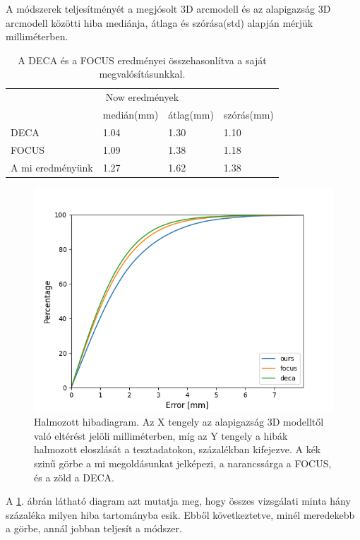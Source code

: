 \documentclass[12pt,a4]{article}
\begin{document}
            A módszerek teljesítményét a megjósolt 3D arcmodell és az alapigazság 3D arcmodell közötti hiba mediánja, átlaga és szórása(std) alapján mérjük milliméterben. 
            
            \begin{table}[htb]\centering
            \begin{tabular}{llll}
            \multicolumn{4}{c}{Now eredmények}                 \\
                             & medián(mm) & átlag(mm) & szórás(mm) \\
            DECA             & 1.04       & 1.30     & 1.10    \\
            FOCUS            & 1.09       & 1.38     & 1.18    \\
            A mi eredményünk & 1.27       & 1.62     & 1.38   
            \end{tabular}
            \caption{A DECA és a FOCUS eredményei összehasonlítva a saját megvalósításunkkal.}
            \end{table}

            \begin{figure}[h]	
    		      \centering
    		      \includegraphics[width=1\linewidth]{cummulative-error.png}
                \caption{Halmozott hibadiagram. Az X tengely az alapigazság 3D modelltől való eltérést jelöli milliméterben, míg az Y tengely a hibák halmozott eloszlását a tesztadatokon, százalékban kifejezve. A kék szinű görbe a mi megoldásunkat jelképezi, a narancssárga a \cite{focus}FOCUS, és a zöld a \cite{DECA}DECA.}
                 \label{fig:cummulative-error}
    	    \end{figure} 

            A \ref{fig:cummulative-error}. ábrán látható diagram azt mutatja meg, hogy összes vizsgálati minta hány százaléka milyen hiba tartományba esik. Ebből következtetve, minél meredekebb a görbe, annál jobban teljesít a módszer.

            

            
        
 
\end{document}
